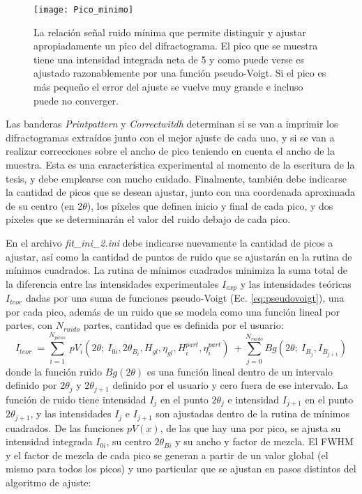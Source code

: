\begin{figure}[!htb]
  \centering
  \texttt{[image: Pico\_minimo]}
  \caption{La relación señal ruido mínima que permite distinguir y ajustar apropiadamente un pico del difractograma. El pico que se muestra tiene una intensidad integrada neta de 5 y como puede verse es ajustado razonablemente por una función pseudo-Voigt. Si el pico es más pequeño el error del ajuste se vuelve muy grande e incluso puede no converger.}
  \label{fig:MinIntensity}
\end{figure}

Las banderas \textit{Printpattern} y \textit{Correctwitdh} determinan si se van a imprimir los difractogramas extraídos junto con el mejor ajuste de cada uno, y si se van a realizar correcciones sobre el ancho de pico teniendo en cuenta el ancho de la muestra.
Esta es una característica experimental al momento de la escritura de la tesis, y debe emplearse con mucho cuidado.
Finalmente, también debe indicarse la cantidad de picos que se desean ajustar, junto con una coordenada aproximada de su centro (en 2$\theta$), los píxeles que definen inicio y final de cada pico, y dos píxeles que se determinarán el valor del ruido debajo de cada pico.

En el archivo \hypertarget{fitini}{\textit{fit\_ini\_2.ini}} debe indicarse nuevamente la cantidad de picos a ajustar, así como la cantidad de puntos de ruido que se ajustarán en la rutina de mínimos cuadrados.
La rutina de mínimos cuadrados minimiza la suma total de la diferencia entre las intensidades experimentales $I_{exp}$ y las intensidades teóricas $I_{teor}$ dadas por una suma de funciones pseudo-Voigt (Ec. \ref{eq:pseudovoigt}), una por cada pico, además de un ruido que se modela como una función lineal por partes, con $N_{ruido}$ partes, cantidad que es definida por el usuario:
\begin{equation}
  I_{teor} \ = \sum_{i=1}^{N_{picos}} \ pV_i (2\theta; \ I_{0i}, 2\theta_{B_i}, H_{gl}, \eta_{gl}, H_i^{part}, \eta_i^{part}) \ + \sum_{j=0}^{N_{ruido}} Bg(2\theta; \ I_{B_j}, I_{B_{j+1}})
  \label{eq:Iteor}
\end{equation}
\noindent
donde la función ruido $Bg(2\theta)$ es una función lineal dentro de un intervalo definido por $2\theta_j$ y $2\theta_{j+1}$ definido por el usuario y cero fuera de ese intervalo.
La función de ruido tiene intensidad $I_j$ en el punto $2\theta_j$ e intensidad $I_{j+1}$ en el punto $2\theta_{j+1}$, y las intensidades $I_j$ e $I_{j+1}$ son ajustadas dentro de la rutina de mínimos cuadrados.
De las funciones $pV(x)$, de las que hay una por pico, se ajusta su intensidad integrada $I_{0i}$, su centro $2\theta_{Bi}$ y su ancho y factor de mezcla.
El FWHM y el factor de mezcla de cada pico se generan a partir de un valor global (el mismo para todos los picos) y uno particular que se ajustan en pasos distintos del algoritmo de ajuste:

